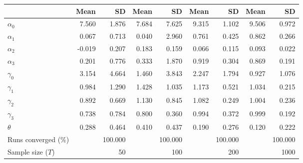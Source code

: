 
\begin{tabular}[t]{lrrrrrrrr}
\toprule
  & Mean & SD & Mean  & SD  & Mean   & SD   & Mean    & SD   \\
\midrule
$\alpha_{0}$ & 7.560 & 1.876 & 7.684 & 7.625 & 9.315 & 1.102 & 9.506 & 0.972\\
$\alpha_{1}$ & 0.067 & 0.713 & 0.040 & 2.960 & 0.761 & 0.425 & 0.862 & 0.266\\
$\alpha_{2}$ & -0.019 & 0.207 & 0.183 & 0.159 & 0.066 & 0.115 & 0.093 & 0.022\\
$\alpha_{3}$ & 0.201 & 0.776 & 0.333 & 1.870 & 0.919 & 0.304 & 0.869 & 0.191\\
$\gamma_{0}$ & 3.154 & 4.664 & 1.460 & 3.843 & 2.247 & 1.794 & 0.927 & 1.076\\
$\gamma_{1}$ & 0.984 & 1.290 & 1.428 & 1.035 & 1.173 & 0.521 & 1.034 & 0.215\\
$\gamma_{2}$ & 0.892 & 0.669 & 1.130 & 0.845 & 1.082 & 0.249 & 1.004 & 0.236\\
$\gamma_{3}$ & 0.738 & 0.784 & 0.800 & 0.360 & 0.994 & 0.372 & 0.999 & 0.192\\
$\theta$ & 0.288 & 0.464 & 0.410 & 0.437 & 0.190 & 0.276 & 0.120 & 0.222\\
Runs converged (\%) &  & 100.000 &  & 100.000 &  & 100.000 &  & 100.000\\
Sample size ($T$) &  & 50 &  & 100 &  & 200 &  & 1000\\
\bottomrule
\end{tabular}
